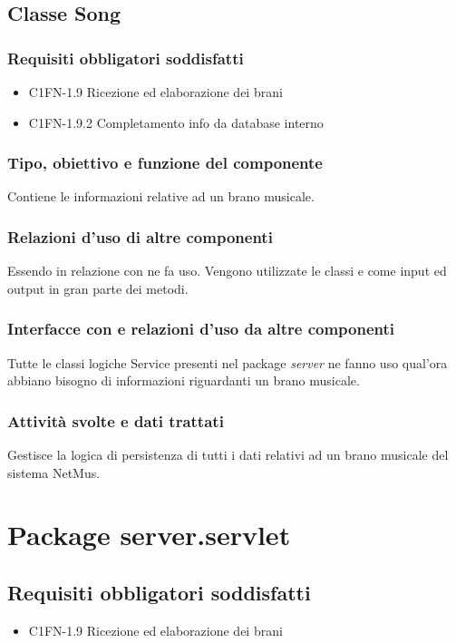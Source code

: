 \subsection{Classe Song}
\subsubsection*{Requisiti obbligatori soddisfatti}
\begin{itemize}
	\item C1FN-1.9 Ricezione ed elaborazione dei brani
	\item C1FN-1.9.2 Completamento info da database interno
\end{itemize}
\subsubsection*{Tipo, obiettivo e funzione del componente} Contiene le
informazioni relative ad un brano musicale. 
\subsubsection*{Relazioni d'uso di
altre componenti} Essendo in relazione con  ne fa uso. Vengono
utilizzate le classi  e  come input ed output
in gran parte dei metodi. 
\subsubsection*{Interfacce con e relazioni d'uso da
altre componenti} Tutte le classi logiche Service presenti nel package
\emph{server} ne fanno uso qual'ora abbiano bisogno di informazioni riguardanti
un brano musicale. 
\subsubsection*{Attivit\`a svolte e dati trattati} Gestisce
la logica di persistenza di tutti i dati relativi ad un brano musicale del
sistema NetMus.

\newpage
\section{Package server.servlet}
\subsection*{Requisiti obbligatori soddisfatti}
\begin{itemize}
	\item C1FN-1.9 Ricezione ed elaborazione dei brani
\end{itemize}
